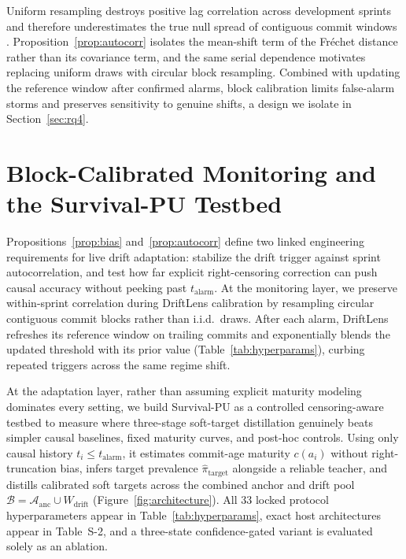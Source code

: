\documentclass[pdflatex,sn-basic]{sn-jnl}
\theoremstyle{definition}
\theoremstyle{plain}
\begin{document}
Uniform resampling destroys positive lag correlation across development sprints and therefore underestimates the true null spread of contiguous commit windows \citep{kunsch1989jackknife,politis1992circular}. Proposition~\ref{prop:autocorr} isolates the mean-shift term of the Fr\'echet distance rather than its covariance term, and the same serial dependence motivates replacing uniform draws with circular block resampling. Combined with updating the reference window after confirmed alarms, block calibration limits false-alarm storms and preserves sensitivity to genuine shifts, a design we isolate in Section~\ref{sec:rq4}.

\section{Block-Calibrated Monitoring and the Survival-PU Testbed}
\label{sec:method}

Propositions~\ref{prop:bias} and~\ref{prop:autocorr} define two linked engineering requirements for live drift adaptation: stabilize the drift trigger against sprint autocorrelation, and test how far explicit right-censoring correction can push causal accuracy without peeking past $t_{\text{alarm}}$. At the monitoring layer, we preserve within-sprint correlation during DriftLens calibration by resampling circular contiguous commit blocks rather than i.i.d.\ draws. After each alarm, DriftLens refreshes its reference window on trailing commits and exponentially blends the updated threshold with its prior value (Table~\ref{tab:hyperparams}), curbing repeated triggers across the same regime shift.

At the adaptation layer, rather than assuming explicit maturity modeling dominates every setting, we build Survival-PU as a controlled censoring-aware testbed to measure where three-stage soft-target distillation genuinely beats simpler causal baselines, fixed maturity curves, and post-hoc controls. Using only causal history $t_i \le t_{\text{alarm}}$, it estimates commit-age maturity $c(a_i)$ without right-truncation bias, infers target prevalence $\hat{\pi}_{\text{target}}$ alongside a reliable teacher, and distills calibrated soft targets across the combined anchor and drift pool $\mathcal{B} = \mathcal{A}_{\text{anc}} \cup W_{\text{drift}}$ (Figure~\ref{fig:architecture}). All 33 locked protocol hyperparameters appear in Table~\ref{tab:hyperparams}, exact host architectures appear in Table~S-2, and a three-state confidence-gated variant is evaluated solely as an ablation.
\end{document}
